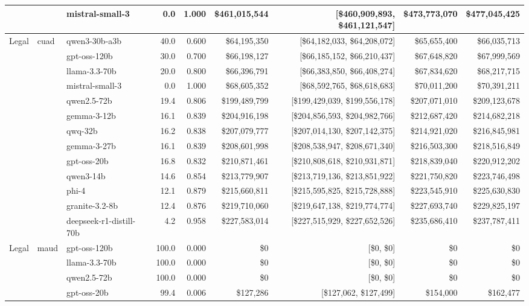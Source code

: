 \begin{table}[t]
\begin{tabular}{lllrrrrrr}
   &  & mistral-small-3 & 0.0 & 1.000 & \$461,015,544 & [\$460,909,893, \$461,121,547] & \$473,773,070 & \$477,045,425 \\
\midrule
  Legal & cuad & qwen3-30b-a3b & 40.0 & 0.600 & \$64,195,350 & [\$64,182,033, \$64,208,072] & \$65,655,400 & \$66,035,713 \\
   &  & gpt-oss-120b & 30.0 & 0.700 & \$66,198,127 & [\$66,185,152, \$66,210,437] & \$67,648,820 & \$67,999,569 \\
   &  & llama-3.3-70b & 20.0 & 0.800 & \$66,396,791 & [\$66,383,850, \$66,408,274] & \$67,834,620 & \$68,217,715 \\
   &  & mistral-small-3 & 0.0 & 1.000 & \$68,605,352 & [\$68,592,765, \$68,618,683] & \$70,011,200 & \$70,391,211 \\
   &  & qwen2.5-72b & 19.4 & 0.806 & \$199,489,799 & [\$199,429,039, \$199,556,178] & \$207,071,010 & \$209,123,678 \\
   &  & gemma-3-12b & 16.1 & 0.839 & \$204,916,198 & [\$204,856,593, \$204,982,766] & \$212,687,420 & \$214,682,218 \\
   &  & qwq-32b & 16.2 & 0.838 & \$207,079,777 & [\$207,014,130, \$207,142,375] & \$214,921,020 & \$216,845,981 \\
   &  & gemma-3-27b & 16.1 & 0.839 & \$208,601,998 & [\$208,538,947, \$208,671,340] & \$216,503,300 & \$218,516,849 \\
   &  & gpt-oss-20b & 16.8 & 0.832 & \$210,871,461 & [\$210,808,618, \$210,931,871] & \$218,839,040 & \$220,912,202 \\
   &  & qwen3-14b & 14.6 & 0.854 & \$213,779,907 & [\$213,719,136, \$213,851,922] & \$221,750,820 & \$223,746,498 \\
   &  & phi-4 & 12.1 & 0.879 & \$215,660,811 & [\$215,595,825, \$215,728,888] & \$223,545,910 & \$225,630,830 \\
   &  & granite-3.2-8b & 12.4 & 0.876 & \$219,710,060 & [\$219,647,138, \$219,774,774] & \$227,693,740 & \$229,825,197 \\
   &  & deepseek-r1-distill-70b & 4.2 & 0.958 & \$227,583,014 & [\$227,515,929, \$227,652,526] & \$235,686,410 & \$237,787,411 \\
\midrule
  Legal & maud & gpt-oss-120b & 100.0 & 0.000 & \$0 & [\$0, \$0] & \$0 & \$0 \\
   &  & llama-3.3-70b & 100.0 & 0.000 & \$0 & [\$0, \$0] & \$0 & \$0 \\
   &  & qwen2.5-72b & 100.0 & 0.000 & \$0 & [\$0, \$0] & \$0 & \$0 \\
   &  & gpt-oss-20b & 99.4 & 0.006 & \$127,286 & [\$127,062, \$127,499] & \$154,000 & \$162,477 \\

\end{tabular}
\end{table}
